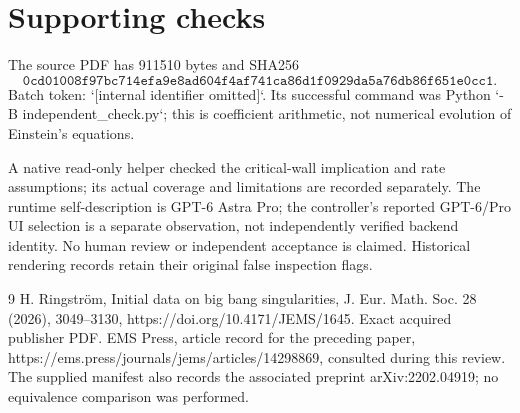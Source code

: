 \documentclass[10pt]{article}
\begin{document}
\section*{Supporting checks}
The source PDF has 911510 bytes and SHA256 \[\texttt{0cd01008f97bc714efa9e8ad604f4af741ca86d1f0929da5a76db86f651e0cc1}.\] Batch token: `[internal identifier omitted]`. Its successful command was Python `-B independent\_check.py`; this is coefficient arithmetic, not numerical evolution of Einstein’s equations.\par
A native read-only helper checked the critical-wall implication and rate assumptions; its actual coverage and limitations are recorded separately. The runtime self-description is GPT-6 Astra Pro; the controller’s reported GPT-6/Pro UI selection is a separate observation, not independently verified backend identity. No human review or independent acceptance is claimed. Historical rendering records retain their original false inspection flags.\par
9 H. Ringström, Initial data on big bang singularities, J. Eur. Math. Soc. 28 (2026), 3049–3130, https://doi.org/10.4171/JEMS/1645. Exact acquired publisher PDF. EMS Press, article record for the preceding paper, https://ems.press/journals/jems/articles/14298869, consulted during this review. The supplied manifest also records the associated preprint arXiv:2202.04919; no equivalence comparison was performed.\par
\end{document}
